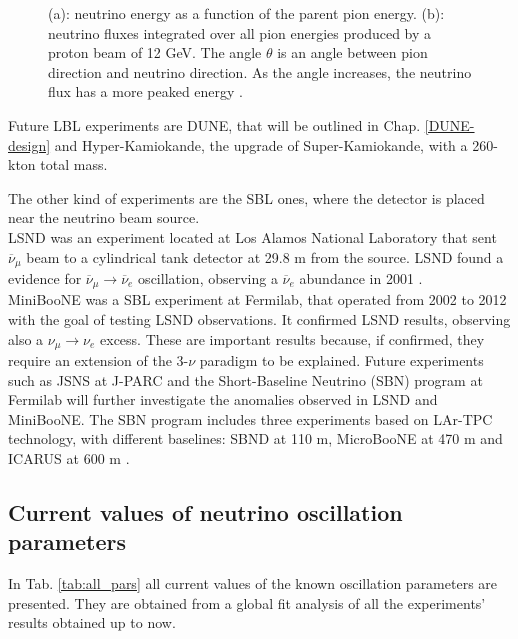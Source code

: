 \begin{figure}
    \centering
    \hfil
    \caption{(a): neutrino energy as a function of the parent pion energy. (b): neutrino fluxes integrated over all pion energies produced by a proton beam of 12 GeV. The angle $\theta$ is an angle between pion direction and neutrino direction. As the angle increases, the neutrino flux has a more peaked energy \cite{off-axis-plots}.}
    \label{fig:off-axis-plots}
\end{figure}
\noindent Future LBL experiments are DUNE, that will be outlined in Chap. \ref{DUNE-design} and Hyper-Kamiokande, the upgrade of Super-Kamiokande, with a 260-kton total mass.

The other kind of experiments are the SBL ones, where the detector is placed near the neutrino beam source. \\LSND was an experiment located at Los Alamos National Laboratory that sent $\overline{\nu}_\mu$ beam to a cylindrical tank detector at 29.8 m from the source. LSND found a evidence for $\overline{\nu}_\mu \rightarrow \overline{\nu}_e$ oscillation, observing a $\overline{\nu}_e$ abundance in 2001 \cite{LSND-abundance}. \\MiniBooNE was a SBL experiment at Fermilab, that operated from 2002 to 2012 with the goal of testing LSND observations. It confirmed LSND results, observing also a $\nu_\mu \rightarrow \nu_e$ excess. 
These are important results because, if confirmed, they require an extension of the 3-$\nu$ paradigm to be explained. Future experiments such as JSNS at J-PARC and the Short-Baseline Neutrino (SBN) program at Fermilab will further investigate the anomalies observed in LSND and MiniBooNE. The SBN program includes three experiments based on LAr-TPC technology, with different baselines: SBND at 110 m, MicroBooNE at 470 m and ICARUS at 600 m \cite{SBN-program}. 

\subsection{Current values of neutrino oscillation parameters}
\label{current_pars}
In Tab. \ref{tab:all_pars} all current values of the known oscillation parameters are presented. They are obtained from a global fit analysis of all the experiments' results obtained up to now. 

